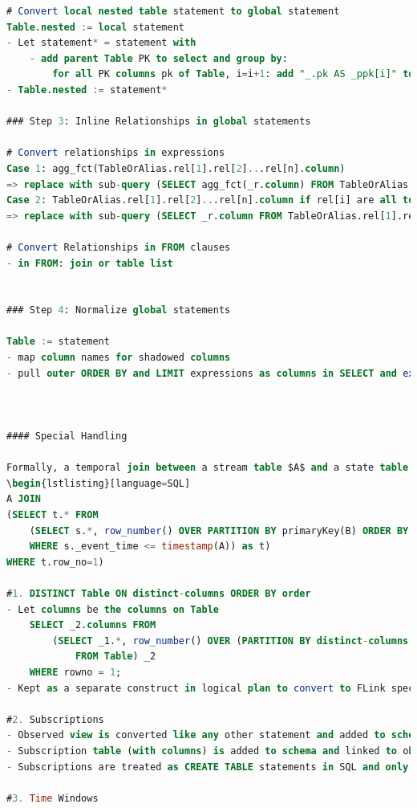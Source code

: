 \documentclass[	DIV=calc,%
							paper=letter,%
							fontsize=11pt,%
							twocolumn]{scrartcl}	 					%
\begin{document}
\begin{lstlisting}[language=SQL]
# Convert local nested table statement to global statement
Table.nested := local statement
- Let statement* = statement with
    - add parent Table PK to select and group by:
        for all PK columns pk of Table, i=i+1: add "_.pk AS _ppk[i]" to SELECT and "_.pk" to GROUP BY
- Table.nested := statement*

### Step 3: Inline Relationships in global statements

# Convert relationships in expressions
Case 1: agg_fct(TableOrAlias.rel[1].rel[2]...rel[n].column)
=> replace with sub-query (SELECT agg_fct(_r.column) FROM TableOrAlias.rel[1].rel[2]...rel[n] AS _r)
Case 2: TableOrAlias.rel[1].rel[2]...rel[n].column if rel[i] are all to-0/1 relationships
=> replace with sub-query (SELECT _r.column FROM TableOrAlias.rel[1].rel[2]...rel[n] AS _r)

# Convert Relationships in FROM clauses
- in FROM: join or table list


### Step 4: Normalize global statements

Table := statement
- map column names for shadowed columns
- pull outer ORDER BY and LIMIT expressions as columns in SELECT and extract as meta data for Table in schema



#### Special Handling

Formally, a temporal join between a stream table $A$ and a state table $B$ is defined as:
\begin{lstlisting}[language=SQL]
A JOIN
(SELECT t.* FROM
	(SELECT s.*, row_number() OVER PARTITION BY primaryKey(B) ORDER BY s._event_time DESC AS row_no FROM (SUBSCRIBE ON CHANGE TO B) as s
	WHERE s._event_time <= timestamp(A)) as t)
WHERE t.row_no=1)

#1. DISTINCT Table ON distinct-columns ORDER BY order
- Let columns be the columns on Table
    SELECT _2.columns FROM
        (SELECT _1.*, row_number() OVER (PARTITION BY distinct-columns ORDER BY order) AS rowno
            FROM Table) _2
    WHERE rowno = 1;
- Kept as a separate construct in logical plan to convert to FLink special handlign

#2. Subscriptions
- Observed view is converted like any other statement and added to schema and logical plans
- Subscription table (with columns) is added to schema and linked to observed view with observation type (ADD, DELETE, UPDATE)
- Subscriptions are treated as CREATE TABLE statements in SQL and only materialized in flink by producing a change-stream

#3. Time Windows


\end{lstlisting}
\end{document}
